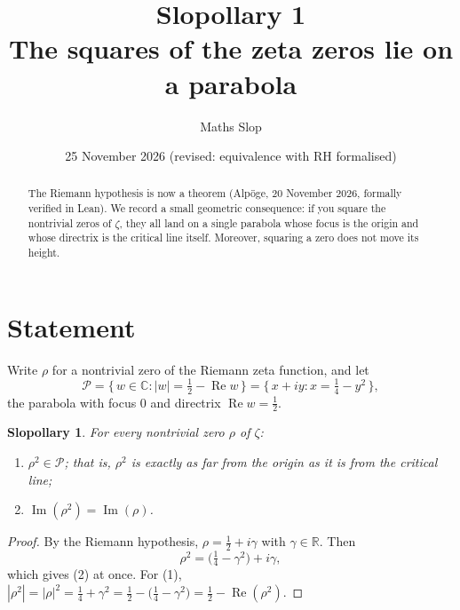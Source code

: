 \documentclass[11pt,a4paper]{article}
\title{\textbf{Slopollary 1}\\[2pt]\large The squares of the zeta zeros lie on a parabola}
\author{Maths Slop}
\date{25 November 2026 (revised: equivalence with RH formalised)}
\newtheorem{theorem}{Slopollary}
\theoremstyle{remark}\newtheorem*{remark}{Remark}
\begin{document}
\maketitle

\begin{abstract}
The Riemann hypothesis is now a theorem (Alp\"oge, 20 November 2026, formally
verified in Lean). We record a small geometric consequence: if you square the
nontrivial zeros of $\zeta$, they all land on a single parabola whose focus is
the origin and whose directrix is the critical line itself. Moreover, squaring a
zero does not move its height.
\end{abstract}

\section*{Statement}
Write $\rho$ for a nontrivial zero of the Riemann zeta function, and let
\[
  \mathcal{P}=\bigl\{\,w\in\mathbb{C} : |w| = \tfrac12-\operatorname{Re}w\,\bigr\}
  =\bigl\{\,x+iy : x=\tfrac14-y^{2}\,\bigr\},
\]
the parabola with focus $0$ and directrix $\operatorname{Re}w=\tfrac12$.

\begin{theorem}
For every nontrivial zero $\rho$ of $\zeta$:
\begin{enumerate}
  \item $\rho^{2}\in\mathcal{P}$; that is, $\rho^2$ is exactly as far from the
        origin as it is from the critical line;
  \item $\operatorname{Im}(\rho^{2})=\operatorname{Im}(\rho)$.
\end{enumerate}
\end{theorem}

\begin{proof}
By the Riemann hypothesis, $\rho=\tfrac12+i\gamma$ with $\gamma\in\mathbb{R}$. Then
\[
  \rho^{2}=\bigl(\tfrac14-\gamma^{2}\bigr)+i\gamma ,
\]
which gives (2) at once. For (1), $|\rho^{2}|=|\rho|^{2}=\tfrac14+\gamma^{2}
=\tfrac12-\bigl(\tfrac14-\gamma^{2}\bigr)=\tfrac12-\operatorname{Re}(\rho^{2})$.
\end{proof}
\end{document}
